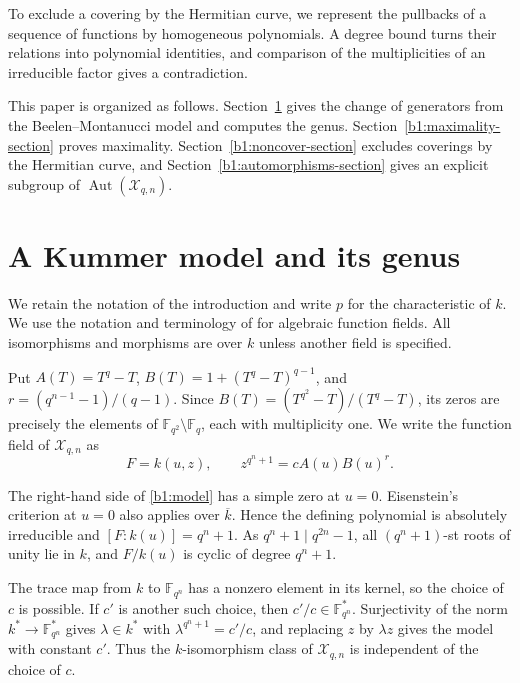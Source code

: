 \documentclass[12pt,reqno]{amsart}
\numberwithin{equation}{section}
\newcommand{\F}{\mathbb F}
\DeclareMathOperator{\Aut}{Aut}
\theoremstyle{plain}
\theoremstyle{definition}
\theoremstyle{remark}
\begin{document}
To exclude a covering by the Hermitian curve, we represent the
pullbacks of a sequence of functions by homogeneous polynomials.
A degree bound turns their relations into polynomial identities,
and comparison of the multiplicities of an irreducible factor
gives a contradiction.

This paper is organized as follows. Section~\ref{b1:model-section} gives the change of generators from the
Beelen--Montanucci model and computes the genus.
Section~\ref{b1:maximality-section} proves maximality.
Section~\ref{b1:noncover-section} excludes coverings by the Hermitian
curve, and Section~\ref{b1:automorphisms-section} gives an explicit
subgroup of \(\Aut(\mathcal X_{q,n})\).


\section{A Kummer model and its genus}
\label{b1:model-section}

We retain the notation of the introduction and write \(p\) for the
characteristic of \(k\). We use the notation and terminology of
\cite{Stichtenoth2009} for algebraic function fields.
All isomorphisms and morphisms are over \(k\) unless another field
is specified.

Put \(A(T)=T^q-T\), \(B(T)=1+(T^q-T)^{q-1}\), and
\(r=(q^{n-1}-1)/(q-1)\).
Since \(B(T)=(T^{q^2}-T)/(T^q-T)\), its zeros are precisely the
elements of \(\F_{q^2}\setminus\F_q\), each with multiplicity one.
We write the function field of \(\mathcal X_{q,n}\) as
\begin{equation}
\label{b1:model}
 F=k(u,z),\qquad z^{q^n+1}=cA(u)B(u)^r.
\end{equation}

The right-hand side of \eqref{b1:model} has a simple zero at \(u=0\).
Eisenstein's criterion at \(u=0\) also applies over \(\overline k\).
Hence the defining polynomial is absolutely irreducible and
\([F:k(u)]=q^n+1\).
As \(q^n+1\mid q^{2n}-1\), all \((q^n+1)\)-st roots of unity lie in \(k\),
and \(F/k(u)\) is cyclic of degree \(q^n+1\).

The trace map from \(k\) to \(\F_{q^n}\) has a nonzero element in its
kernel, so the choice of \(c\) is possible.  If \(c'\) is another such
choice, then \(c'/c\in\F_{q^n}^*\).  Surjectivity of the norm
\(k^*\to\F_{q^n}^*\) gives \(\lambda\in k^*\) with
\(\lambda^{q^n+1}=c'/c\), and replacing \(z\) by \(\lambda z\)
gives the model with constant \(c'\).
Thus the \(k\)-isomorphism class of \(\mathcal X_{q,n}\) is independent
of the choice of \(c\).
\end{document}
